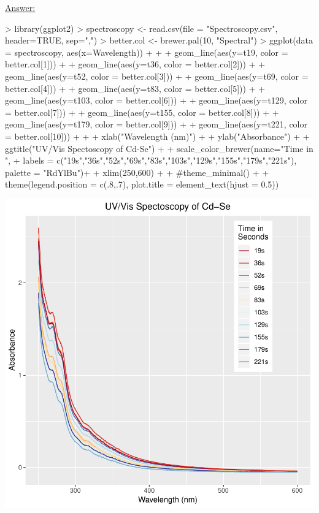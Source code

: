 \documentclass[12pt,letterpaper,final]{article}
\begin{document}
\begin{enumerate}
\begin{enumerate}
\underline{Answer:}
{\scriptsize
\begin{Schunk}
\begin{Sinput}
> library(ggplot2)
> spectroscopy <- read.csv(file = "Spectroscopy.csv", header=TRUE, sep=",")
> better.col <- brewer.pal(10, "Spectral")
> ggplot(data = spectroscopy, aes(x=Wavelength)) + 
+   
+   geom_line(aes(y=t19, color = better.col[1])) +
+   geom_line(aes(y=t36, color = better.col[2])) +
+   geom_line(aes(y=t52, color = better.col[3])) +
+   geom_line(aes(y=t69, color = better.col[4])) +
+   geom_line(aes(y=t83, color = better.col[5])) +
+   geom_line(aes(y=t103, color = better.col[6])) +
+   geom_line(aes(y=t129, color = better.col[7])) +
+   geom_line(aes(y=t155, color = better.col[8])) +
+   geom_line(aes(y=t179, color = better.col[9])) +
+   geom_line(aes(y=t221, color = better.col[10])) +
+   
+   xlab("Wavelength (nm)") +
+   ylab("Absorbance") +
+   ggtitle("UV/Vis Spectoscopy of Cd-Se") +
+   scale_color_brewer(name="Time in \nSeconds",
+                       labels = c("19s","36s","52s","69s","83s","103s","129s","155s","179s","221s"), palette = "RdYlBu")+
+   xlim(250,600) +
+   #theme_minimal() + 
+   theme(legend.position = c(.8,.7), plot.title = element_text(hjust = 0.5))
\end{Sinput}
\end{Schunk}
\includegraphics{hw02_bartschi-008}
}



\end{enumerate}
\end{enumerate}
\end{document}
